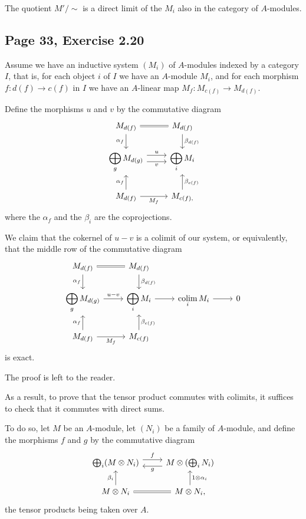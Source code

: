 \documentclass[parskip=half,fontsize=12pt]{scrartcl}%
\newcommand{\ds}{\displaystyle}
\begin{document}
The quotient $M'/\sim$ is a direct limit of the $M_i$ also in the category of $A$-modules.

\subsection{Page 33, Exercise 2.20}%

Assume we have an inductive system $(M_i)$ of $A$-modules indexed by a category  $I$, that is, for each object $i$ of $I$ we have an $A$-module $M_i$, and for each morphism $f:d(f)\to c(f)$ in $I$ we have an $A$-linear map $M_f:M_{c(f)}\to M_{d(f)}$. 

Define the morphisms $u$ and $v$ by the commutative diagram
$$
\begin{tikzcd}
M_{d(f)}\ar[d,"\alpha_{f}"']\ar[r,equal]&M_{d(f)}\ar[d,"\beta_{d(f)}"]\\ 
\ds\bigoplus_gM_{d(g)}\ar[r,yshift=0.9ex,"u"]\ar[r,yshift=-0.9ex,"v"']&\ds\bigoplus_iM_i\\ 
M_{d(f)}\ar[u,"\alpha_{f}"]\ar[r,"M_f"']&M_{c(f),}\ar[u,"\beta_{c(f)}"']
\end{tikzcd}
$$ 
where the $\alpha_f$ and the $\beta_i$ are the coprojections. 

We claim that the cokernel of $u-v$ is a colimit of our system, or equivalently, that the middle row of the commutative diagram 
$$
\begin{tikzcd}
M_{d(f)}\ar[d,"\alpha_{f}"']\ar[r,equal]&M_{d(f)}\ar[d,"\beta_{d(f)}"]\\ 
\ds\bigoplus_gM_{d(g)}\ar[r,"u-v"]&\ds\bigoplus_iM_i\ar[r]&\ds\ooo{colim}_iM_i\ar[r]&0\\ 
M_{d(f)}\ar[u,"\alpha_{f}"]\ar[r,"M_f"']&M_{c(f)}\ar[u,"\beta_{c(f)}"']
\end{tikzcd}
$$ 
is exact. 

The proof is left to the reader.

As a result, to prove that the tensor product commutes with colimits, it suffices to check that it commutes with direct sums. 

To do so, let $M$ be an $A$-module, let $(N_i)$ be a family of $A$-module, and define the morphisms $f$ and $g$ by the commutative diagram 
$$
\begin{tikzcd} 
\bigoplus_i(M\otimes N_i)\ar[r,yshift=0.9ex,"f"]\ar[r,leftarrow,yshift=-0.9ex,"g"']& M\otimes\left(\bigoplus_iN_i\right)\\ 
M\otimes N_i\ar[u,"\beta_i"]\ar[r,equal]&M\otimes N_i,\ar[u,"1\otimes\alpha_i"']
\end{tikzcd}
$$ 
the tensor products being taken over $A$.
\end{document}
